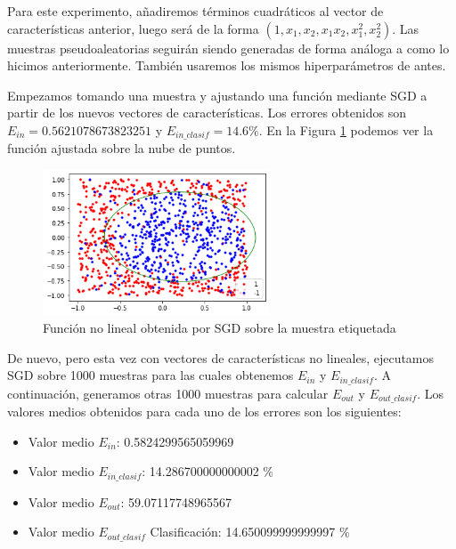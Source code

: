\documentclass[10pt,a4paper]{article}
\begin{document}
Para este experimento, añadiremos términos cuadráticos al vector de características anterior, luego será de la forma $(1, x_1, x_2, x_1 x_2, x_1^2, x_2^2)$. Las muestras pseudoaleatorias seguirán siendo generadas de forma análoga a como lo hicimos anteriormente. También usaremos los mismos hiperparámetros de antes.

Empezamos tomando una muestra y ajustando una función mediante SGD a partir de los nuevos vectores de características. Los errores obtenidos son $E_{in} = 0.5621078673823251$ y $E_{in\_clasif} = 14.6 \%$. En la Figura \ref{fig:ej2.2_sgd_no_lineal} podemos ver la función ajustada sobre la nube de puntos.

\begin{figure}[h]
	\centering
	\includegraphics[width=0.6\textwidth]{ej2.2_sgd_no_lineal}
	\caption{Función no lineal obtenida por SGD sobre la muestra etiquetada}
	\label{fig:ej2.2_sgd_no_lineal}
\end{figure}

De nuevo, pero esta vez con vectores de características no lineales, ejecutamos SGD sobre 1000 muestras para las cuales obtenemos $E_{in}$ y $E_{in\_clasif}$. A continuación, generamos otras 1000 muestras para calcular $E_{out}$ y $E_{out\_clasif}$. Los valores medios obtenidos para cada uno de los errores son los siguientes:

\begin{itemize}
	\item Valor medio $E_{in}$: 0.5824299565059969
	\item Valor medio $E_{in\_clasif}$: 14.286700000000002 \%
	\item Valor medio $E_{out}$: 59.07117748965567
	\item Valor medio $E_{out\_clasif}$ Clasificación: 14.650099999999997 \%
\end{itemize}
\end{document}
